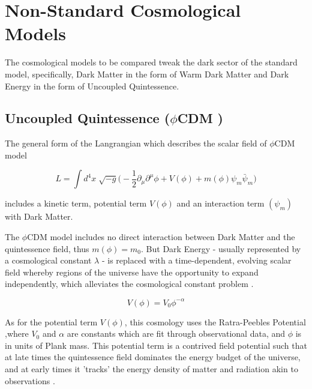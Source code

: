 \documentclass[a4paper,fleqn,usenatbib]{mnras}
\def \qcdm{$\phi$CDM }
\begin{document}
\section{Non-Standard Cosmological Models}\label{cosmos}
The cosmological models to be compared tweak the dark sector of the standard model, specifically, Dark Matter in the form of Warm Dark Matter and Dark Energy in the form of Uncoupled Quintessence. 

\subsection{Uncoupled Quintessence  (\qcdm)}
The general form of the Langrangian which describes the scalar field of \qcdm model
\begin{ceqn}
\begin{equation}
L=\int d^{4}x\sqrt[]{-g}\big(-\frac{1}{2}\partial_{\mu}\partial^{\mu}\phi+V(\phi)+m(\phi)\psi_{m}\bar{\psi}_{m}\big)
\end{equation}
\end{ceqn}
includes a kinetic term, potential term $V(\phi)$ and an interaction term $(\psi_{m})$ with Dark Matter.

The \qcdm model includes no direct interaction between Dark Matter and the quintessence field, thus $m(\phi)=m_{0}$. But Dark Energy - usually represented by a cosmological constant $\lambda$ - is replaced with a time-dependent, evolving scalar field whereby regions of the universe have the opportunity to expand independently, which alleviates the cosmological constant problem \citep{Joyce_15}.
\begin{ceqn}
\begin{equation}
V(\phi)=V_{0}\phi^{-\alpha}\label{rp}
\end{equation}
\end{ceqn}
As for the potential term $V(\phi)$, this cosmology uses the Ratra-Peebles Potential  \citep{Ratra_88},where $V_{0}$ and $\alpha$ are constants which are fit through observational data, and $\phi$ is in units of Plank mass. This potential term is a contrived field potential such that at late times the quintessence field dominates the energy budget of the universe, and at early times it 'tracks' the energy density of matter and radiation akin to observations \citep{Joyce_15}.
\end{document}
